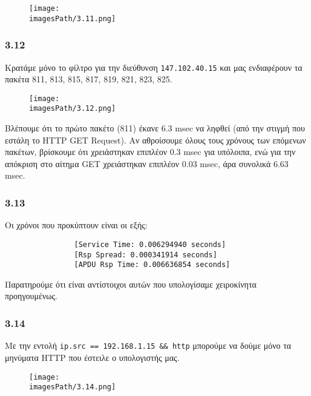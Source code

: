 			\begin{figure}[H]
				\texttt{[image: \\imagesPath/3.11.png]}
			\end{figure}
		
		\subsubsection*{3.12}
		
			Κρατάμε μόνο το φίλτρο για την διεύθυνση \verb|147.102.40.15| και μας ενδιαφέρουν τα πακέτα 811, 813, 815, 817, 819, 821, 823, 825.
			
			\begin{figure}[H]
				\texttt{[image: \\imagesPath/3.12.png]}
			\end{figure}
		
			Βλέπουμε ότι το πρώτο πακέτο (811) έκανε 6.3 msec να ληφθεί (από την στιγμή που εστάλη το HTTP GET Request).
			Αν αθροίσουμε όλους τους χρόνους των επόμενων πακέτων, βρίσκουμε ότι χρειάστηκαν επιπλέον 0.3 msec για υπόλοιπα, ενώ για την απόκριση στο αίτημα GET χρειάστηκαν επιπλέον 0.03 msec, άρα συνολικά 6.63 msec.
		
		
		\subsubsection*{3.13}
			Οι χρόνοι που προκύπτουν είναι οι εξής:
		
			\begin{verbatim}
				[Service Time: 0.006294940 seconds]
				[Rsp Spread: 0.000341914 seconds]
				[APDU Rsp Time: 0.006636854 seconds]
			\end{verbatim}
			
			Παρατηρούμε ότι είναι αντίστοιχοι αυτών που υπολογίσαμε χειροκίνητα προηγουμένως.
			
		\subsubsection*{3.14}	
			Με την εντολή \verb|ip.src == 192.168.1.15 && http| μπορούμε να δούμε μόνο τα μηνύματα HTTP που έστειλε ο υπολογιστής μας.
			
			\begin{figure}[H]
				\texttt{[image: \\imagesPath/3.14.png]}
			\end{figure}
